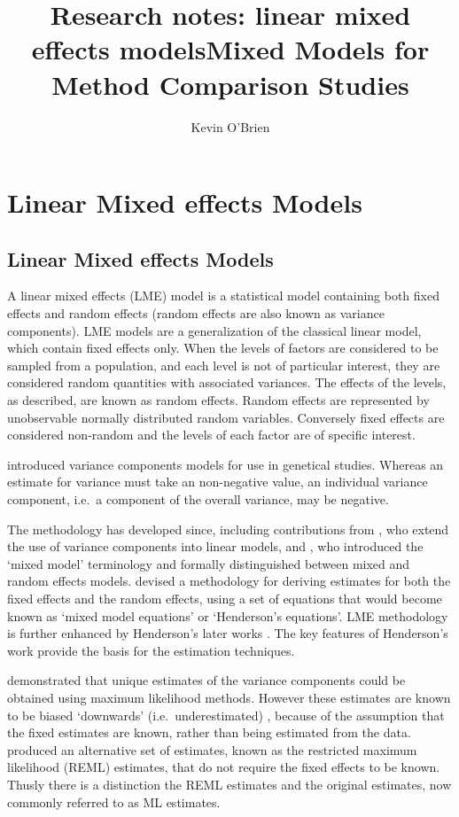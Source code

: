 \documentclass[12pt, a4paper]{article}
\title{Research notes: linear mixed effects models}
\author{ } \date{ }
\theoremstyle{plain}
\theoremstyle{definition}
\theoremstyle{remark}
\begin{document}
\author{Kevin O'Brien}
\title{Mixed Models for Method Comparison Studies}


\chapter{Linear Mixed effects Models}
\section{Linear Mixed effects Models}
A linear mixed effects (LME) model is a statistical model containing both fixed effects and random effects (random effects are also known as variance components). LME models are a generalization of the classical linear model, which contain fixed effects only. When the levels of factors are considered to be sampled from a population,
and each level is not of particular interest, they are considered random quantities with associated variances.
The effects of the levels, as described, are known as random effects. Random effects are represented by unobservable
normally distributed random variables. Conversely fixed effects are considered non-random and the
levels of each factor are of specific interest.

\citet{Fisher4} introduced variance components models for use in genetical studies. Whereas an estimate for variance must take an non-negative value, an individual variance component, i.e.\ a component of the overall variance, may be negative.

The methodology has developed since, including contributions from
\citet{tippett}, who extend the use of variance components into linear models, and \citet{eisenhart}, who introduced the `mixed model' terminology and formally distinguished between mixed and random effects models. \citet{Henderson:1950} devised a methodology for deriving estimates for both the fixed effects and the random effects, using a set of equations that would become known as `mixed model equations' or `Henderson's equations'.
LME methodology is further enhanced by Henderson's later works \citep{Henderson53, Henderson59,Henderson63,Henderson73,Henderson84a}. The key features of Henderson's work provide the basis for the estimation techniques.

\citet{HartleyRao} demonstrated that unique estimates of the variance components could be obtained using maximum likelihood methods. However these estimates are known to be biased `downwards' (i.e.\ underestimated) , because of the assumption that the fixed estimates are known, rather than being estimated from the data. \citet{PattersonThompson} produced an alternative set of estimates, known as the restricted maximum likelihood (REML) estimates, that do not require the fixed effects to be known. Thusly there is a distinction the REML estimates and the original estimates, now commonly referred to as ML estimates.
\end{document}
